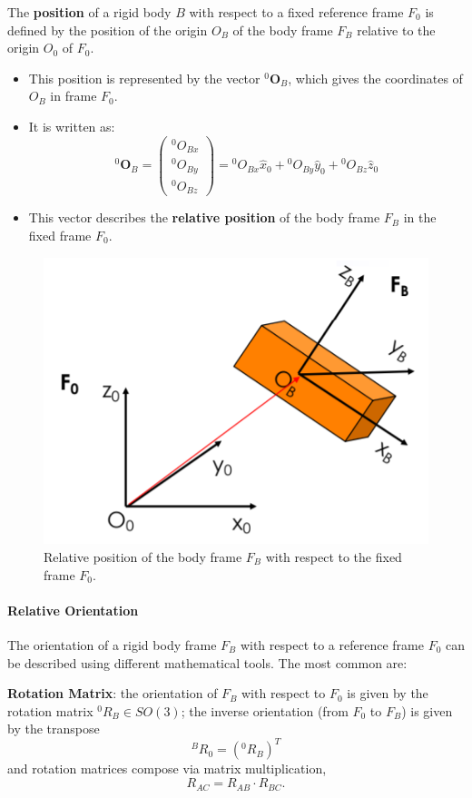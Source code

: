 The \textbf{position} of a rigid body $B$ with respect to a fixed reference frame $F_0$ is defined by the position of the origin $O_B$ of the body frame $F_B$ relative to the origin $O_0$ of $F_0$.

\begin{itemize}
  \item This position is represented by the vector ${}^0\mathbf{O}_B$, which gives the coordinates of $O_B$ in frame $F_0$.
  \item It is written as:
    \[
    {}^0\mathbf{O}_B = 
    \begin{pmatrix}
      {}^0 O_{Bx} \\
      {}^0 O_{By} \\
      {}^0 O_{Bz}
    \end{pmatrix}
    =
    {}^0 O_{Bx} \hat{x}_0 + {}^0 O_{By} \hat{y}_0 + {}^0 O_{Bz} \hat{z}_0
    \]
  \item This vector describes the \textbf{relative position} of the body frame $F_B$ in the fixed frame $F_0$.
\end{itemize}

\begin{figure}[H]
  \centering
  \includegraphics[width=0.5\linewidth]{imgs/relative_position.png}
  \caption{Relative position of the body frame $F_B$ with respect to the fixed frame $F_0$.}
\end{figure}

\hfill

\paragraph{Relative Orientation} \hfill

The orientation of a rigid body frame $F_B$ with respect to a reference frame $F_0$ can be described using different mathematical tools. The most common are:

\textbf{Rotation Matrix}: the orientation of $F_B$ with respect to $F_0$ is given by the rotation matrix ${}^0R_B \in SO(3)$; the inverse orientation (from $F_0$ to $F_B$) is given by the transpose
\[
{}^B R_0 = ({}^0 R_B)^T
\]
and rotation matrices compose via matrix multiplication,
\[
R_{AC} = R_{AB} \cdot R_{BC}.
\]

